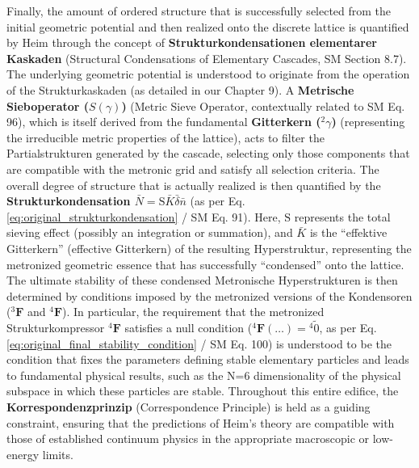 \documentclass[12pt]{article}
\newcommand{\q}[1]{\enquote{#1}}
\newcommand{\metrischesieboperator}{S(\gamma)}
\newcommand{\metronisiertekondensor}[1]{{}^{#1}\mathbf{F}}
\begin{document}
Finally, the amount of ordered structure that is successfully selected from the initial geometric potential and then realized onto the discrete lattice is quantified by Heim through the concept of \textbf{Strukturkondensationen elementarer Kaskaden} (Structural Condensations of Elementary Cascades, SM Section 8.7). The underlying geometric potential is understood to originate from the operation of the Strukturkaskaden (as detailed in our Chapter 9). A \textbf{Metrische Sieboperator (\( \metrischesieboperator \))} (Metric Sieve Operator, contextually related to SM Eq. 96), which is itself derived from the fundamental \textbf{Gitterkern (\({}^2\gamma\))} (representing the irreducible metric properties of the lattice), acts to filter the Partialstrukturen generated by the cascade, selecting only those components that are compatible with the metronic grid and satisfy all selection criteria. The overall degree of structure that is actually realized is then quantified by the \textbf{Strukturkondensation \( \bar{N} = \mathrm{S}\bar{K}\bar{\delta}\bar{n} \)} (as per Eq. \eqref{eq:original_strukturkondensation} / SM Eq. 91). Here, \( \mathrm{S} \) represents the total sieving effect (possibly an integration or summation), and \( \bar{K} \) is the \q{effektive Gitterkern} (effective Gitterkern) of the resulting Hyperstruktur, representing the metronized geometric essence that has successfully \q{condensed} onto the lattice. The ultimate stability of these condensed Metronische Hyperstrukturen is then determined by conditions imposed by the metronized versions of the Kondensoren (\( \metronisiertekondensor{3} \) and \( \metronisiertekondensor{4} \)). In particular, the requirement that the metronized Strukturkompressor \( \metronisiertekondensor{4} \) satisfies a null condition (\( \metronisiertekondensor{4}(\dots) = {}^{4}\tilde{0} \), as per Eq. \eqref{eq:original_final_stability_condition} / SM Eq. 100) is understood to be the condition that fixes the parameters defining stable elementary particles and leads to fundamental physical results, such as the N=6 dimensionality of the physical subspace in which these particles are stable. Throughout this entire edifice, the \textbf{Korrespondenzprinzip} (Correspondence Principle) is held as a guiding constraint, ensuring that the predictions of Heim's theory are compatible with those of established continuum physics in the appropriate macroscopic or low-energy limits.
\end{document}
